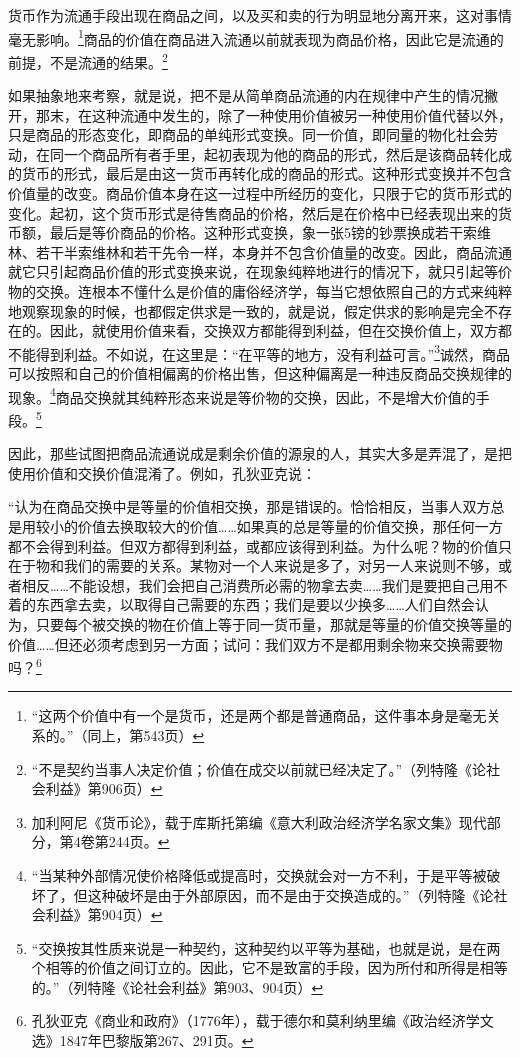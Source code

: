 \documentclass{ctexbook}
\begin{document}
    货币作为流通手段出现在商品之间，以及买和卖的行为明显地分离开来，这对事情毫无影响。\footnote{“这两个价值中有一个是货币，还是两个都是普通商品，这件事本身是毫无关系的。”（同上，第543页）}商品的价值在商品进入流通以前就表现为商品价格，因此它是流通的前提，不是流通的结果。\footnote{“不是契约当事人决定价值；价值在成交以前就已经决定了。”（列特隆《论社会利益》第906页）}

    如果抽象地来考察，就是说，把不是从简单商品流通的内在规律中产生的情况撇开，那末，在这种流通中发生的，除了一种使用价值被另一种使用价值代替以外，只是商品的形态变化，即商品的单纯形式变换。同一价值，即同量的物化社会劳动，在同一个商品所有者手里，起初表现为他的商品的形式，然后是该商品转化成的货币的形式，最后是由这一货币再转化成的商品的形式。这种形式变换并不包含价值量的改变。商品价值本身在这一过程中所经历的变化，只限于它的货币形式的变化。起初，这个货币形式是待售商品的价格，然后是在价格中已经表现出来的货币额，最后是等价商品的价格。这种形式变换，象一张5镑的钞票换成若干索维林、若干半索维林和若干先令一样，本身并不包含价值量的改变。因此，商品流通就它只引起商品价值的形式变换来说，在现象纯粹地进行的情况下，就只引起等价物的交换。连根本不懂什么是价值的庸俗经济学，每当它想依照自己的方式来纯粹地观察现象的时候，也都假定供求是一致的，就是说，假定供求的影响是完全不存在的。因此，就使用价值来看，交换双方都能得到利益，但在交换价值上，双方都不能得到利益。不如说，在这里是：“在平等的地方，没有利益可言。”\footnote{加利阿尼《货币论》，载于库斯托第编《意大利政治经济学名家文集》现代部分，第4卷第244页。}诚然，商品可以按照和自己的价值相偏离的价格出售，但这种偏离是一种违反商品交换规律的现象。\footnote{“当某种外部情况使价格降低或提高时，交换就会对一方不利，于是平等被破坏了，但这种破坏是由于外部原因，而不是由于交换造成的。”（列特隆《论社会利益》第904页）}商品交换就其纯粹形态来说是等价物的交换，因此，不是增大价值的手段。\footnote{“交换按其性质来说是一种契约，这种契约以平等为基础，也就是说，是在两个相等的价值之间订立的。因此，它不是致富的手段，因为所付和所得是相等的。”（列特隆《论社会利益》第903、904页）}

    因此，那些试图把商品流通说成是剩余价值的源泉的人，其实大多是弄混了，是把使用价值和交换价值混淆了。例如，孔狄亚克说：

    “认为在商品交换中是等量的价值相交换，那是错误的。恰恰相反，当事人双方总是用较小的价值去换取较大的价值……如果真的总是等量的价值交换，那任何一方都不会得到利益。但双方都得到利益，或都应该得到利益。为什么呢？物的价值只在于物和我们的需要的关系。某物对一个人来说是多了，对另一人来说则不够，或者相反……不能设想，我们会把自己消费所必需的物拿去卖……我们是要把自己用不着的东西拿去卖，以取得自己需要的东西；我们是要以少换多……人们自然会认为，只要每个被交换的物在价值上等于同一货币量，那就是等量的价值交换等量的价值……但还必须考虑到另一方面；试问：我们双方不是都用剩余物来交换需要物吗？\footnote{孔狄亚克《商业和政府》（1776年），载于德尔和莫利纳里编《政治经济学文选》1847年巴黎版第267、291页。}
\end{document}
